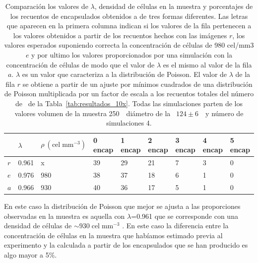 \begin{spacing}{1}
\begin{table}[H]
\renewcommand\tablename{Tabla}
\renewcommand{\arraystretch}{1.5}
\centering
    
    \setlength{\extrarowheight}{-2pt}
    \begin{tabular}{ C{1cm} C{1.5cm} C{2.2cm} C{1.5cm} C{1.5cm} C{1.5cm} C{1.5cm} C{1.5cm} C{1.5cm} }
        \hline
         & $\lambda$ & \small{$\rho\:(\mathrm{cel\;{mm}^{-3}})$} & 0 encap & 1 encap & 2 encap & 3 encap & 4 encap & 5 encap \\
        \hline
        \hline
        $r$ & 0.961 & x & 39 & 29 & 21 & 7 & 3 & 0 \\
        $e$ & 0.976 & 980 & 38 & 37 & 18 & 6 & 1 & 0 \\
        $a$ & 0.966 & 930 & 40 & 36 & 17 & 5 & 1 & 0 \\
        \hline
    \end{tabular}

    \caption{\small Comparación los valores de $\lambda$, densidad de células en la muestra y porcentajes de los recuentos de encapsulados obtenidos a de tres formas diferentes. Las letras que aparecen en la primera columna indican si los valores de la fila pertenecen a los valores obtenidos a partir de los recuentos hechos con las imágenes $r$, los valores esperados suponiendo correcta la concentración de células de 980 cel/mm3 $e$ y por ultimo los valores proporcionados por una simulación con la concentración de células de modo que el valor de $\lambda$ es el mismo al valor de la fila $a$. $\lambda$ es un valor que caracteriza a la distribución de Poisson. El valor de $\lambda$ de la fila $r$ se obtiene a partir de un ajuste por mínimos cuadrados de una distribución de Poisson multiplicada por un factor de escala a los recuentos totales del número de \gotas\ de la Tabla~\ref{tab:resultados_10x}. Todas las simulaciones parten de los valores volumen de la muestra 250~\milimetrocubico\ diámetro de la \gota\ $124\pm6$~\micrometro\ y número de simulaciones 4. }
    \label{tab:comparacion_porcentajes_10x}
    
\end{table}
\end{spacing}

En este caso la distribución de Poisson que mejor se ajusta a las proporciones observadas en la muestra es aquella con $\lambda$=0.961 que se corresponde con una densidad de células de $\sim930\;\mathrm{cel\;mm^{-3}}$ . En este caso la diferencia entre la concentración de células en la muestra que habíamos estimado previa al experimento y la calculada a partir de los encapsulados que se han producido es algo mayor a 5\%.

